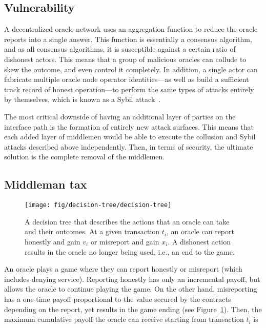 \documentclass[11pt]{article}
\begin{document}
\subsection{Vulnerability}
\label{sec:vulnerability}

A decentralized oracle network uses an aggregation function to reduce the oracle reports into a single answer.
This function is essentially a consensus algorithm, and as all consensus algorithms, it is susceptible against a certain ratio of dishonest actors.
This means that a group of malicious oracles can collude to skew the outcome, and even control it completely.
In addition, a single actor can fabricate multiple oracle node operator identities—as well as build a sufficient track record of honest operation—to perform the same types of attacks entirely by themselves, which is known as a Sybil attack~\cite{douceur:2002}.

The most critical downside of having an additional layer of parties on the interface path is the formation of entirely new attack surfaces.
This means that each added layer of middlemen would be able to execute the collusion and Sybil attacks described above independently.
Then, in terms of security, the ultimate solution is the complete removal of the middlemen.

\subsection{Middleman tax}
\label{sec:middleman-tax}

\begin{figure}
    \centering
	\texttt{[image: fig/decision-tree/decision-tree]}
	\caption{A decision tree that describes the actions that an oracle can take and their outcomes.
	At a given transaction $t_i$, an oracle can report honestly and gain $v_i$ or misreport and gain $x_i$.
	A dishonest action results in the oracle no longer being used, i.e., an end to the game.}
	\label{fig:decision-tree}
\end{figure}

An oracle plays a game where they can report honestly or misreport (which includes denying service).
Reporting honestly has only an incremental payoff, but allows the oracle to continue playing the game.
On the other hand, misreporting has a one-time payoff proportional to the value secured by the contracts depending on the report, yet results in the game ending (see Figure~\ref{fig:decision-tree}).
Then, the maximum cumulative payoff the oracle can receive starting from transaction $t_i$ is
\end{document}
